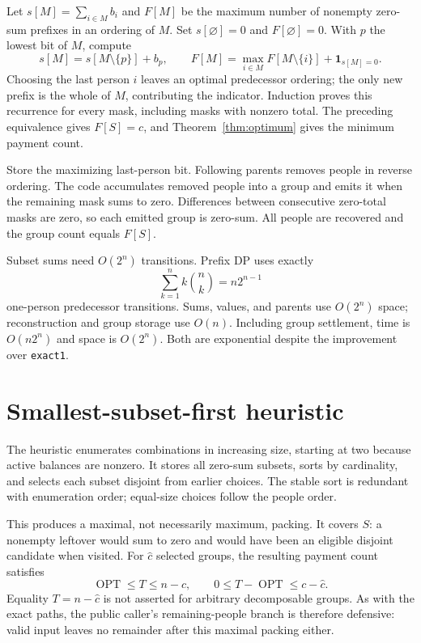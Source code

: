 \documentclass[11pt]{article}
\begin{document}
Let $s[M]=\sum_{i\in M}b_i$ and $F[M]$ be the maximum number of nonempty
zero-sum prefixes in an ordering of $M$. Set $s[\varnothing]=0$ and
$F[\varnothing]=0$. With $p$ the lowest bit of $M$, compute
\[
 s[M]=s[M\setminus\{p\}]+b_p,\qquad
 F[M]=\max_{i\in M}F[M\setminus\{i\}]+\mathbf{1}_{s[M]=0}.
\]
Choosing the last person $i$ leaves an optimal predecessor ordering;
the only new prefix is the whole of $M$, contributing the indicator.
Induction proves this recurrence for every mask, including masks with
nonzero total. The preceding equivalence gives $F[S]=c$, and
Theorem~\ref{thm:optimum} gives the minimum payment count.

Store the maximizing last-person bit. Following parents removes people
in reverse ordering. The code accumulates removed people into a group
and emits it when the remaining mask sums to zero. Differences between
consecutive zero-total masks are zero, so each emitted group is zero-sum.
All people are recovered and the group count equals $F[S]$.

Subset sums need $O(2^n)$ transitions. Prefix DP uses exactly
\[
 \sum_{k=1}^n k\binom nk=n2^{n-1}
\]
one-person predecessor transitions. Sums, values, and parents use
$O(2^n)$ space; reconstruction and group storage use $O(n)$.
Including group settlement, time is $O(n2^n)$ and space is $O(2^n)$.
Both are exponential despite the improvement over \texttt{exact1}.

\section{Smallest-subset-first heuristic}\label{sec:heuristic}
The heuristic enumerates combinations in increasing size, starting at
two because active balances are nonzero. It stores all zero-sum subsets,
sorts by cardinality, and selects each subset disjoint from earlier
choices. The stable sort is redundant with enumeration order; equal-size
choices follow the people order.

This produces a maximal, not necessarily maximum, packing. It covers
$S$: a nonempty leftover would sum to zero and would have been an
eligible disjoint candidate when visited. For $\hat c$ selected groups,
the resulting payment count satisfies
\[
 \operatorname{OPT}\leq T\leq n-\hat c,\qquad
 0\leq T-\operatorname{OPT}\leq c-\hat c.
\]
Equality $T=n-\hat c$ is not asserted for arbitrary decomposable groups.
As with the exact paths, the public caller's remaining-people branch is
therefore defensive: valid input leaves no remainder after this maximal
packing either.
\end{document}
